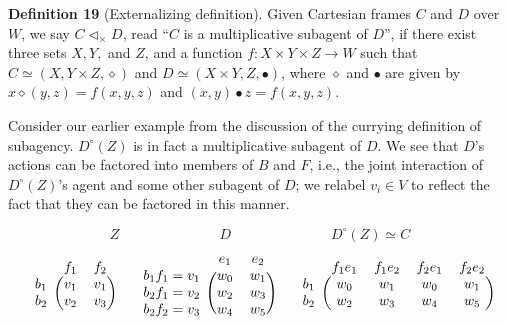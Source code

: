 \documentclass{article}
\begin{document}
\bigskip
\noindent \textbf{Definition 19} (Externalizing definition).
Given Cartesian frames $C$ and $D$ over $W$, we say $C \triangleleft_{\times} D$, read ``$C$ is a multiplicative subagent of $D$'', if there exist three sets $X, Y,$ and $Z$, and a function $f : X \times Y \times Z \to W$ such that $C \simeq (X, Y \times Z, \diamond)$ and $D \simeq (X \times Y, Z, \bullet)$, where $\diamond$ and $\bullet$ are given by $x \diamond (y, z) = f(x, y, z)$ and $(x, y) \bullet z = f(x, y, z)$.

\bigskip
\noindent Consider our earlier example from the discussion of the currying definition of subagency.
$D^{\circ}(Z)$ is in fact a multiplicative subagent of $D$.
We see that $D$'s actions can be factored into members of $B$ and $F$, i.e., the joint interaction of $D^{\circ}(Z)$'s agent and some other subagent of $D$;
we relabel $v_i \in V$ to reflect the fact that they can be factored in this manner.


\[
Z
\hspace{3cm}
D
\hspace{3cm}
D^{\circ}(Z) \simeq C
\]
\[
\begin{blockarray}{ccc}
& f_1 & f_2 \\
\begin{block}{c(cc)}
b_1 & v_1 & v_1 \\
b_2 & v_2 & v_3 \\
\end{block}
\end{blockarray}
\hspace{.5cm}
\begin{blockarray}{ccc}
& e_1 & e_2 \\
\begin{block}{c(cc)}
b_{1}f_1=v_1 & w_0 & w_1 \\
b_{2}f_1=v_2 & w_2 & w_3 \\
b_{2}f_2=v_3 & w_4 & w_5 \\
\end{block}
\end{blockarray}
\hspace{.5cm}
\begin{blockarray}{ccccc}
& f_{1}e_1 & f_{1}e_2 & f_{2}e_1 & f_{2}e_2 \\
\begin{block}{c(cccc)}
b_1 & w_0 & w_1 & w_0 & w_1 \\
b_2 & w_2 & w_3 & w_4 & w_5 \\
\end{block}
\end{blockarray}
\]
\end{document}
